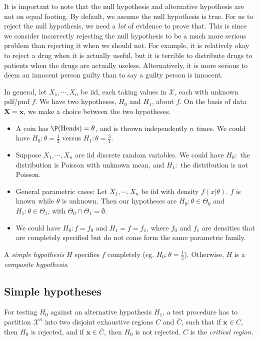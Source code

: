 \documentclass[a4paper]{article}
\begin{document}
It is important to note that the null hypothesis and alternative hypothesis are not on equal footing. By default, we assume the null hypothesis is true. For us to reject the null hypothesis, we need a \emph{lot} of evidence to prove that. This is since we consider incorrectly rejecting the null hypothesis to be a much more serious problem than rejecting it when we should not. For example, it is relatively okay to reject a drug when it is actually useful, but it is terrible to distribute drugs to patients when the drugs are actually useless. Alternatively, it is more serious to deem an innocent person guilty than to say a guilty person is innocent.

In general, let $X_1, \cdots, X_n$ be iid, each taking values in $\mathcal{X}$, each with unknown pdf/pmf $f$. We have two hypotheses, $H_0$ and $H_1$, about $f$. On the basis of data $\mathbf{X} = \mathbf{x}$, we make a choice between the two hypotheses.

\begin{eg}\leavevmode
  \begin{itemize}
    \item A coin has $\P(\text{Heads}) = \theta$, and is thrown independently $n$ times. We could have $H_0:\theta = \frac{1}{2}$ versus $H_1: \theta = \frac{3}{4}.$
    \item Suppose $X_1, \cdots, X_n$ are iid discrete random variables. We could have $H_0:$ the distribution is Poisson with unknown mean, and $H_1:$ the distribution is not Poisson.
    \item General parametric cases: Let $X_1, \cdots , X_n$ be iid with density $f(x|\theta)$. $f$ is known while $\theta$ is unknown. Then our hypotheses are $H_0: \theta\in \Theta_0$ and $H_1:\theta\in \Theta_1$, with $\Theta_0\cap \Theta_1 = \emptyset$.
    \item We could have $H_0: f = f_0$ and $H_1 = f = f_1$, where $f_0$ and $f_1$ are densities that are completely specified but do not come form the same parametric family.
  \end{itemize}
\end{eg}

\begin{defi}
  A \emph{simple hypothesis} $H$ specifies $f$ completely (eg. $H_0: \theta = \frac{1}{2}$). Otherwise, $H$ is a \emph{composite hypothesis}.
\end{defi}

\subsection{Simple hypotheses}
\begin{defi}
  For testing $H_0$ against an alternative hypothesis $H_1$, a test procedure has to partition $\mathcal{X}^n$ into two disjoint exhaustive regions $C$ and $\bar C$, such that if $\mathbf{x}\in C$, then $H_0$ is rejected, and if $\mathbf{x}\in \bar C$, then $H_0$ is not rejected. $C$ is the \emph{critical region}.
\end{defi}
\end{document}
